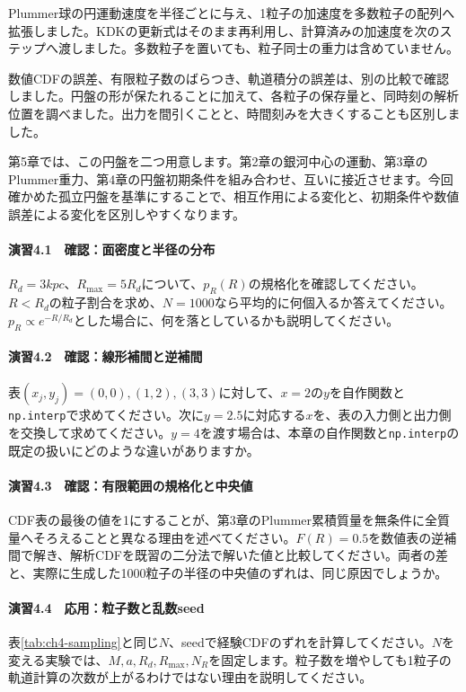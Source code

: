 Plummer球の円運動速度を半径ごとに与え、1粒子の加速度を多数粒子の配列へ拡張しました。KDKの更新式はそのまま再利用し、計算済みの加速度を次のステップへ渡しました。多数粒子を置いても、粒子同士の重力は含めていません。

数値CDFの誤差、有限粒子数のばらつき、軌道積分の誤差は、別の比較で確認しました。円盤の形が保たれることに加えて、各粒子の保存量と、同時刻の解析位置を調べました。出力を間引くことと、時間刻みを大きくすることも区別しました。

第5章では、この円盤を二つ用意します。第2章の銀河中心の運動、第3章のPlummer重力、第4章の円盤初期条件を組み合わせ、互いに接近させます。今回確かめた孤立円盤を基準にすることで、相互作用による変化と、初期条件や数値誤差による変化を区別しやすくなります。

\chapterexercises
\paragraph{演習4.1　確認：面密度と半径の分布}
$R_d=3\unit{kpc}$、$R_{\max}=5R_d$について、$p_R(R)$の規格化を確認してください。$R<R_d$の粒子割合を求め、$N=1000$なら平均的に何個入るか答えてください。$p_R\propto e^{-R/R_d}$とした場合に、何を落としているかも説明してください。

\paragraph{演習4.2　確認：線形補間と逆補間}
表$(x_j,y_j)=(0,0),(1,2),(3,3)$に対して、$x=2$の$y$を自作関数と\texttt{np.interp}で求めてください。次に$y=2.5$に対応する$x$を、表の入力側と出力側を交換して求めてください。$y=4$を渡す場合は、本章の自作関数と\texttt{np.interp}の既定の扱いにどのような違いがありますか。

\paragraph{演習4.3　確認：有限範囲の規格化と中央値}
CDF表の最後の値を1にすることが、第3章のPlummer累積質量を無条件に全質量へそろえることと異なる理由を述べてください。$F(R)=0.5$を数値表の逆補間で解き、解析CDFを既習の二分法で解いた値と比較してください。両者の差と、実際に生成した1000粒子の半径の中央値のずれは、同じ原因でしょうか。

\paragraph{演習4.4　応用：粒子数と乱数seed}
表\ref{tab:ch4-sampling}と同じ$N$、seedで経験CDFのずれを計算してください。$N$を変える実験では、$M,a,R_d,R_{\max},N_R$を固定します。粒子数を増やしても1粒子の軌道計算の次数が上がるわけではない理由を説明してください。

